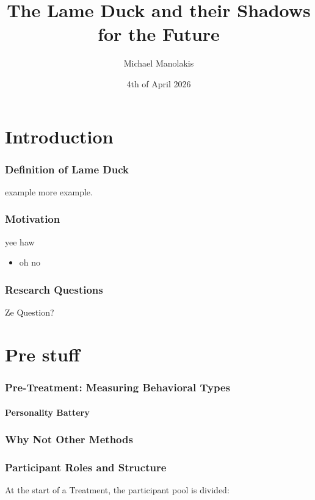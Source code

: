 \documentclass[10pt]{beamer}
\title{The Lame Duck and their Shadows for the Future}
\author[Michael Manolakis]{Michael Manolakis}
\institute[Econ 696 at UH M\=anoa]{University of Hawai`i at M\=anoa}
\date{4th of April 2026}
\begin{document}
\begin{frame}
  \titlepage
\end{frame}



\section{Introduction}

\begin{frame}
    \frametitle{Definition of Lame Duck}
    example \textcolor{Lehua}{more example}.
\end{frame}

\begin{frame}
    \frametitle{Motivation}
    yee haw \\
    \begin{itemize}
        \item oh no
    \end{itemize}
\end{frame}


\begin{frame}
    \frametitle{Research Questions}
      Ze Question?
\end{frame}



\section{Pre stuff}

\begin{frame}
  \frametitle{Pre-Treatment: Measuring Behavioral Types}
  \framesubtitle{Personality Battery}
\end{frame}

\begin{frame}
  \frametitle{Why Not Other Methods}
\end{frame}

\begin{frame}
  \frametitle{Participant Roles and Structure}
  
  At the start of a Treatment, the participant pool is divided:
  \bigskip
  
\end{frame}


\end{document}
